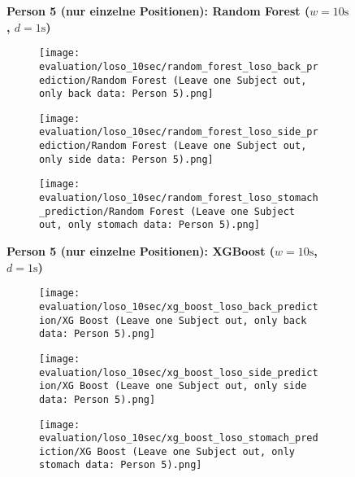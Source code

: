 \begin{figure}
    \textbf{Person 5 (nur einzelne Positionen): Random Forest ($w=10\si{\s}$, $d=1\si{\s}$)}
      \centering
      \begin{subfigure}{1\textwidth}
          \texttt{[image: evaluation/loso\_10sec/random\_forest\_loso\_back\_prediction/Random Forest (Leave one Subject out, only back data: Person 5).png]}
        \end{subfigure}
        \begin{subfigure}{1\textwidth}
          \texttt{[image: evaluation/loso\_10sec/random\_forest\_loso\_side\_prediction/Random Forest (Leave one Subject out, only side data: Person 5).png]}
        \end{subfigure}
        \begin{subfigure}{1\textwidth}
          \texttt{[image: evaluation/loso\_10sec/random\_forest\_loso\_stomach\_prediction/Random Forest (Leave one Subject out, only stomach data: Person 5).png]}
      \end{subfigure}
        \textbf{Person 5 (nur einzelne Positionen): XGBoost ($w=10\si{\s}$, $d=1\si{\s}$)}
      \centering
      \begin{subfigure}{1\textwidth}
          \texttt{[image: evaluation/loso\_10sec/xg\_boost\_loso\_back\_prediction/XG Boost (Leave one Subject out, only back data: Person 5).png]}
        \end{subfigure}
        \begin{subfigure}{1\textwidth}
            \texttt{[image: evaluation/loso\_10sec/xg\_boost\_loso\_side\_prediction/XG Boost (Leave one Subject out, only side data: Person 5).png]}
        \end{subfigure}
        \begin{subfigure}{1\textwidth}
            \texttt{[image: evaluation/loso\_10sec/xg\_boost\_loso\_stomach\_prediction/XG Boost (Leave one Subject out, only stomach data: Person 5).png]}
      \end{subfigure}
  
      \label{evaluation:xgboost:person5}
\end{figure}